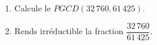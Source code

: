 
\begin{enumerate}
\item Calcule le $PGCD(32\,760,61\,425)$.
\item Rends irréductible la fraction $\dfrac{32\,760}{61\,425}$.
\end{enumerate}
